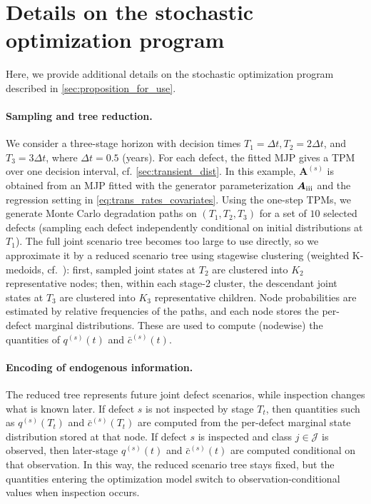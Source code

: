 \documentclass{article}
\newcommand{\RN}[1]{\textup{\uppercase\expandafter{\romannumeral#1}}}
\providecommand{\DIFadd}[1]{{\protect\color{blue} \sf #1}} %
\begin{document}
\section{\DIFadd{Details on the stochastic optimization program}} \label{sec:stochastic_optimization_details}
\DIFadd{Here, we provide additional details on the stochastic optimization program described in \cref{sec:proposition_for_use}.
}\paragraph{\DIFadd{Sampling and tree reduction.}}
\DIFadd{We consider a three-stage horizon with decision times
$T_1=\Delta t, T_2=2\Delta t$, and $T_3=3\Delta t$, where $\Delta t=0.5$ (years).
For each defect, the fitted MJP gives a TPM over one decision interval, cf. \cref{sec:transient_dist}. In this example, $\bm A^{(s)}$ is obtained from an MJP fitted with the generator parameterization $\bm{A}_{\RN{3}}$ and the regression setting in \cref{eq:trans_rates_covariates}.
Using the one-step TPMs, we generate Monte Carlo degradation paths on $(T_1,T_2,T_3)$ for a set of $10$ selected defects (sampling each defect independently conditional on initial distributions at $T_1$).
The full joint scenario tree becomes too large to use directly, so we approximate it by a reduced scenario tree using stagewise clustering (weighted K-medoids, cf.\ \citet{park2009a}): first, sampled joint states at $T_2$ are clustered into $K_2$ representative nodes; then, within each stage-2 cluster, the descendant joint states at $T_3$ are clustered into $K_3$ representative children.
Node probabilities are estimated by relative frequencies of the paths, and each node stores the per-defect marginal distributions. These are used to compute (nodewise) the quantities of $q^{(s)}(t)$ and $\bar c^{(s)}(t)$.
}

\paragraph{\DIFadd{Encoding of endogenous information.}}
\DIFadd{The reduced tree represents future joint defect scenarios, while inspection changes what is known later.
If defect $s$ is not inspected by stage $T_t$, then quantities such as $q^{(s)}(T_t)$ and $\bar c^{(s)}(T_t)$ are computed from the per-defect marginal state distribution stored at that node.
If defect $s$ is inspected and class $j\in\mathcal J$ is observed, then later-stage $q^{(s)}(t)$ and $\bar c^{(s)}(t)$ are computed conditional on that observation.
In this way, the reduced scenario tree stays fixed, but the quantities entering the optimization model switch to observation-conditional values when inspection occurs.
}
\end{document}
